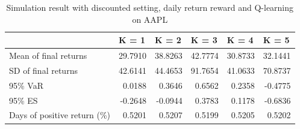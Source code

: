 \documentclass{article}
\begin{document}
\begin{table}[H]
\centering
\begin{tabular}{|l|r|r|r|r|r|} 
\hline
                             & \multicolumn{1}{l|}{K = 1} & \multicolumn{1}{l|}{K = 2} & \multicolumn{1}{l|}{K = 3} & \multicolumn{1}{l|}{K = 4} & \multicolumn{1}{l|}{K = 5}  \\ 
\hline
Mean of final returns        & 29.7910                    & 38.8263                    & 42.7774                    & 30.8733                    & 32.1441                     \\ 
\hline
SD of final returns          & 42.6141                    & 44.4653                    & 91.7654                    & 41.0633                    & 70.8737                     \\ 
\hline
95\% VaR                     & 0.0188                     & 0.3646                     & 0.6562                     & 0.2358                     & -0.4775                     \\ 
\hline
95\% ES                      & -0.2648                    & -0.0944                    & 0.3783                     & 0.1178                     & -0.6836                     \\ 
\hline
Days of positive return (\%) & 0.5201                     & 0.5207                     & 0.5199                     & 0.5205                     & 0.5202                      \\
\hline
\end{tabular}
\caption{Simulation result with discounted setting, daily return reward and Q-learning on AAPL}
\label{table2}
\end{table}
\end{document}
